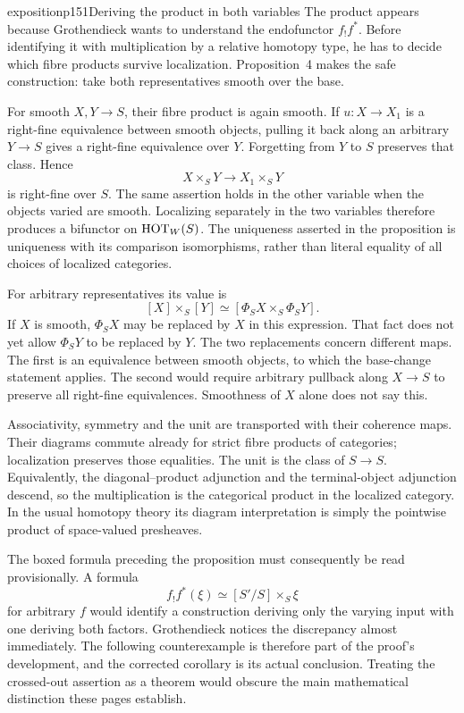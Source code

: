\begin{dcomment}{exposition}{p151}{Deriving the product in both variables}
The product appears because Grothendieck wants to understand the endofunctor $f_!f^*$. Before identifying it with multiplication by a relative homotopy type, he has to decide which fibre products survive localization. Proposition~4 makes the safe construction: take both representatives smooth over the base.

For smooth $X,Y\longrightarrow S$, their fibre product is again smooth. If $u:X\longrightarrow X_1$ is a right-fine equivalence between smooth objects, pulling it back along an arbitrary $Y\longrightarrow S$ gives a right-fine equivalence over $Y$. Forgetting from $Y$ to $S$ preserves that class. Hence
\[
 X\times_SY\longrightarrow X_1\times_SY
\]
is right-fine over $S$. The same assertion holds in the other variable when the objects varied are smooth. Localizing separately in the two variables therefore produces a bifunctor on $\mathrm{HOT}_W(S)$. The uniqueness asserted in the proposition is uniqueness with its comparison isomorphisms, rather than literal equality of all choices of localized categories.

For arbitrary representatives its value is
\[
 [X]\times_S[Y]
 \simeq[\Phi_SX\times_S\Phi_SY].
\]
If $X$ is smooth, $\Phi_SX$ may be replaced by $X$ in this expression. That fact does not yet allow $\Phi_SY$ to be replaced by $Y$. The two replacements concern different maps. The first is an equivalence between smooth objects, to which the base-change statement applies. The second would require arbitrary pullback along $X\longrightarrow S$ to preserve all right-fine equivalences. Smoothness of $X$ alone does not say this.

Associativity, symmetry and the unit are transported with their coherence maps. Their diagrams commute already for strict fibre products of categories; localization preserves those equalities. The unit is the class of $S\longrightarrow S$. Equivalently, the diagonal--product adjunction and the terminal-object adjunction descend, so the multiplication is the categorical product in the localized category. In the usual homotopy theory its diagram interpretation is simply the pointwise product of space-valued presheaves.

The boxed formula preceding the proposition must consequently be read provisionally. A formula
\[
 f_!f^*(\xi)\simeq[S'/S]\times_S\xi
\]
for arbitrary $f$ would identify a construction deriving only the varying input with one deriving both factors. Grothendieck notices the discrepancy almost immediately. The following counterexample is therefore part of the proof's development, and the corrected corollary is its actual conclusion. Treating the crossed-out assertion as a theorem would obscure the main mathematical distinction these pages establish.
\end{dcomment}


